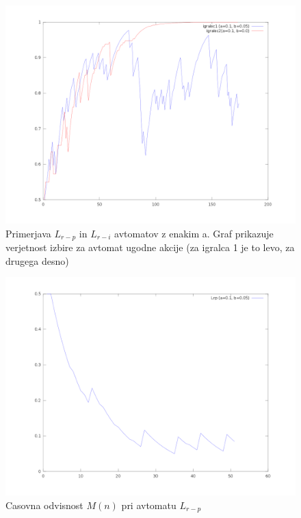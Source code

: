 \documentclass[10pt,a4paper]{report}
\begin{document}
\begin{figure}[h!]
\begin{center}
\includegraphics[scale=0.4]{fig_lrp_lri.png} 
\end{center}
\caption{Primerjava $L_{r-p}$ in $L_{r-i}$ avtomatov z enakim a. Graf prikazuje verjetnost izbire za avtomat ugodne akcije (za igralca 1 je to levo, za drugega desno)}
\end{figure}

\begin{figure}[h!]
\begin{center}
\includegraphics[scale=0.4]{lrp_pen.png} 
\end{center}
\caption{Casovna odvisnost $M(n)$ pri avtomatu $L_{r-p}$}
\end{figure}
\end{document}
